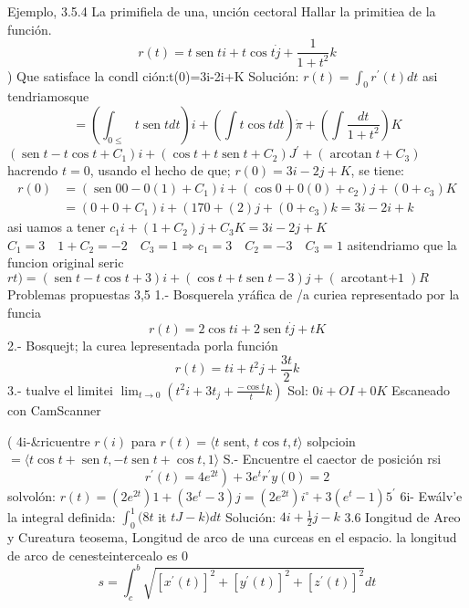 Ejemplo, 3.5.4 La primifiela de una, unción cectoral Hallar la primitiea de la función.
$$
r(t)=t \operatorname{sen} t i+t \cos t \dot{j}+\frac{1}{1+t^2} k
$$
)
Que satisface la condl ción:t(0)=3i-2i+K
Solución: $r(t)=\int_0 r^{\prime}(t) d t$
asi tendriamosque
$$
=\left(\int_{0 \leq} t \operatorname{sen} t d t\right) i+\left(\int t \cos t d t\right) \dot{\pi}+\left(\int \frac{d t}{1+t^2}\right) K
$$
$\left(\operatorname{sen} t-t \cos t+C_1\right) i+\left(\cos t+t \operatorname{sen} t+C_2\right) J^{\prime}+\left(\operatorname{arcotan} t+C_3\right)$ hacrendo $t=0$, usando el hecho de que;
$r(0)=3 i-2 j+K$, se tiene:
$$
\begin{aligned}
	r(0) & =\left(\operatorname{sen} 00-0(1)+C_1\right) i+\left(\cos 0+0(0)+c_2\right) j+\left(0+c_3\right) K \\
	& =\left(0+0+C_1\right) i+\left(170+(2) j+\left(0+c_3\right) k=3 i-2 i+k\right.
\end{aligned}
$$
asi uamos a tener $c_1 i+\left(1+C_2\right) j+C_3 K=3 i-2 j+K$ $C_1=3 \quad 1+C_2=-2 \quad C_3=1 \Rightarrow c_1=3 \quad C_2=-3 \quad C_3=1$
asitendriamo que la funcion original seric $r t)=(\operatorname{sen} t-t \cos t+3) i+(\cos t+t \operatorname{sen} t-3) j+(\operatorname{arcotant+1}) R$ Problemas propuestas 3,5
1.- Bosquerela yráfica de /a curiea representado por la funcia
$$
r(t)=2 \cos t i+2 \operatorname{sen} t \dot{j}+t K
$$
2.- Bosquejt; la curea lepresentada porla función
$$
r(t)=t i+t^2 j+\frac{3 t}{2} k
$$
3.- tualve el limitei $\lim _{t \rightarrow 0}\left(t^2 i+3 t_j+\frac{-\cos t}{t} k\right)$ Sol: $0 i+O I+0 K$
Escaneado con CamScanner




(
4i-\&ricuentre $r(i)$ para $r(t)=\langle t$ sent, $t \cos t, t\rangle$ solpcioin $=\langle t \cos t+\operatorname{sen} t,-t \operatorname{sen} t+\cos t, 1\rangle$ S.- Encuentre el caector de posición rsi
$$
\left.r^{\prime}(t)=4 e^{2 t}\right)+3 e^t r^{\prime} y(0)=2
$$
solvolón: $r(t)=\left(2 e^{2 t}\right) 1+\left(3 e^t-3\right) j=\left(2 e^{2 t}\right) i^{\circ}+3\left(e^t-1\right) 5^{\prime}$ 6i- Ewálv'e la integral definida: $\int_0^1(8 t$ it $t J-k) d t$ Solución: $4 i+\frac{1}{2} j-k$
3.6 Iongitud de Areo y Cureatura
teosema, Longitud de arco de una curceas en el espacio. la longitud de arco de cenesteintercealo es
0
$$
s=\int_c^b \sqrt{\left[x^{\prime}(t)\right]^2+\left[y^{\prime}(t)\right]^2+\left[z^{\prime}(t)\right]^2} d t
$$

